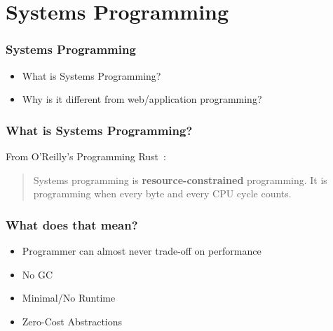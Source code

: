 \section{Systems Programming}
\label{sec:systems-programming}

\begin{frame}
  \frametitle{Systems Programming}
  \begin{itemize}
  \item What is Systems Programming?
  \item Why is it different from web/application programming?
  \end{itemize}
\end{frame}

\begin{frame}
  \frametitle{What is Systems Programming?}
  \begin{block}{From O'Reilly's Programming Rust~\cite{ProgRustPreface1}:}
    \begin{quotation}
      Systems programming is \textbf{resource-constrained}
      programming. It is programming when every byte and every CPU cycle
      counts.
    \end{quotation}
  \end{block}
\end{frame}

\begin{frame}
  \frametitle{What does that mean?}
  \begin{itemize}
  \item Programmer can almost never trade-off on performance
  \item No GC
  \item Minimal/No Runtime
  \item Zero-Cost Abstractions~\cite{Stroustrup}
  \end{itemize}
\end{frame}
